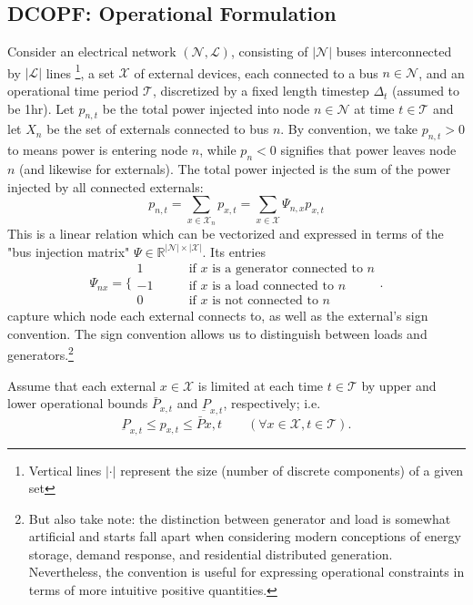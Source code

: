 \documentclass[journal,11pt]{IEEEtran}
\newcommand{\R}{\mathbb{R}}
\renewcommand{\L}{\mathcal{L}}
\newcommand{\X}{\mathcal{X}}
\newcommand{\T}{\mathcal{T}}
\newcommand{\N}{\mathcal{N}}
\newcommand{\sizeX}{\left\vert \X \right\vert}
\newcommand{\sizeN}{\left\vert \N \right\vert}
\newcommand{\sizeL}{\left\vert \L \right\vert}
\begin{document}
\subsection{DCOPF: Operational Formulation}
Consider an electrical network $(\N, \L)$, consisting of $\sizeN$ buses interconnected by $\sizeL$ lines \footnote{Vertical lines $|\cdot|$ represent the size
(number of discrete components) of a given set}, a set $\X$ of external devices, each connected to a bus $n\in \N$, and an operational time period $\T$, discretized
by a fixed length timestep $\Delta_t$ (assumed to be 1hr). Let $p_{n, t}$ be the total power injected into node $n \in \N$ at
time $t \in \T$ and let $X_n$ be the set of externals connected to bus $n$. By convention, we take $p_{n,t} > 0$ to means power is entering node $n$, while $p_{n} < 0$
signifies that power leaves node $n$ (and likewise for externals). The total power injected is the sum of the power injected by all connected externals:
\begin{equation}
  p_{n,t} = \sum_{x\in\X_n} p_{x, t} = \sum_{x \in \X} \Psi_{n,x} p_{x, t}
  \label{eq:bus-injection-scalar}
\end{equation}
This is a linear relation which can be vectorized and expressed in terms of the "bus injection matrix" $\Psi \in \R^{\sizeN \times \sizeX}$.
Its entries
\begin{equation}
  \Psi_{nx} = \biggl\{
    \begin{array}{ll}
      1 &\qquad \text{if $x$ is a generator connected to $n$} \\
      -1 &\qquad \text{if $x$ is a load connected to $n$} \\
      0 &\qquad \text{if $x$ is not connected to $n$}
    \end{array}
  \biggr.
\end{equation}
capture which node each external connects to, as well as the external's
sign convention. The sign convention allows us to distinguish between loads and generators.\footnote{
  But also take note: the distinction between generator and load is somewhat artificial and starts fall apart when considering
  modern conceptions of energy storage, demand response, and residential distributed generation. Nevertheless, the
  convention is useful for expressing operational constraints in terms of more intuitive positive quantities.
}

Assume that each external $x\in\X$ is limited at each time $t\in\T$ by upper and lower operational bounds $\bar{P}_{x, t}$
and $\underbar{P}_{x, t}$, respectively; i.e.
\begin{equation}
  \underbar{P}_{x, t} \leq p_{x, t} \leq \bar{P}{x, t} \qquad (\forall x\in\X, t\in\T).
\end{equation}
\end{document}
